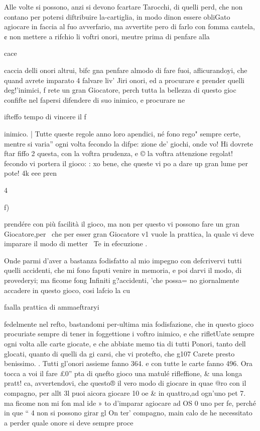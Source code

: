 \documentclass[12pt,a6paper]{article}
\begin{document}
Alle volte si possono, anzi si
devono fcartare Tarocchi, di
quelli perd, che non contano
per potersi diftribuire la-cartiglia, in modo dinon essere obliGato agiocare in faccia al fuo
avverfario, ma avvertite pero di
farlo con fomma cautela, ¢ non
mettere a rifchio li voftri onori,
meutre prima di penfare alla

cace
 

 

 

 

 

 

 

 

caccia delli onori altrui, bifc
gna penfare almodo di fare
fuoi, aflicurandoyi, che quand
avrete imparato 4 falvare liv’
Jiri onori, ed a procurare ¢
prender quelli deg!’inimici, f
rete un gran Giocatore, perch
tutta la bellezza di questo gioc
confifte nel fapersi difendere di
suo inimico, e procurare ne

ifteffo tempo di vincere il f

inimico. |
Tutte queste regole anno
loro apendici, né fono rego"
sempre certe, mentre si varia”
ogni volta fecondo la difpe:
zione de’ giochi, onde vo! Hi
dovrete ftar fiffo 2 questa,
con la voftra prudenza, e ©
la voftra attenzione regolat!
fecondo vi portera il gioco: :
xo bene, che queste vi po a
dare up gran lume per pote! 4k
eee pren

4
 

 

f)

prendére con più facilità il gioco,
ma non per questo vi possono fare un gran Giocatore,per~
che per esser gran Giocatore v1
vuole la prattica, la quale vi deve imparare il modo di metter~
Te in efecuzione .

Onde parmi d’aver a bastanza
fodisfatto al mio impegno con
defcrivervi tutti quelli accidenti, che mi fono faputi venire in
memoria, e poi darvi il modo,
di provederyi; ma ficome fong
Infiniti g?accidenti, 'che possa=
no giornalmente accadere in
questo gioco, cosi lafcio la cu

faalla prattica di ammaeftraryi

fedelmente nel refto, bastandomi per-ultima mia fodisfazione,
che in questo gioco procuriate
sempre di tener in foggettione
i voftro inimico, e che rifletUate
sempre ogni volta alle carte
giocate, e che abbiate memo
tia di tutti Ponori, tanto dell
glocati, quanto di quelli da gi
carsi, che vi protefto, che g107
Carete presto benissimo. .
Tutti gl'onori assieme fanno
364. e con tutte le carte fanno
496. Ora tocca a voi il fare £0”
pta di qnefto gioco una matulé
rifleffione, & una longa pratt!
ca, avvertendovi, che questo®
il vero modo di giocare in quae
@ro con il compagno, per allt
3l puoi aicora giocare 10 oe
& in quattro,ad ogn’uno pet 7.
ma ficome non mi fon mal ide »
to d’imparar agiocare ad OS 0
uno per fe, perché in que “ 4
non si possono girar gl On ter’
compagno, main calo de he
necessitato a perder quale
onore si deve sempre proce
\end{document}
